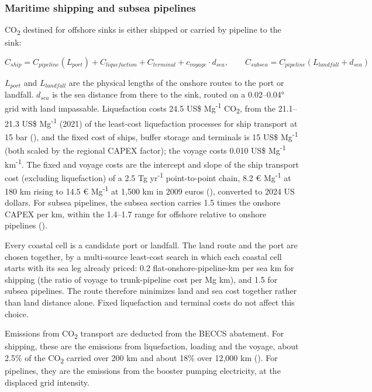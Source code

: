 \documentclass[
  letterpaper,
]{article}
\begin{document}
\subsubsection{Maritime shipping and subsea
pipelines}\label{maritime-shipping-and-subsea-pipelines}

CO\textsubscript{2} destined for offshore sinks is either shipped or
carried by pipeline to the sink:

\[C_{ship} = C_{pipeline}(L_{port}) + C_{liquefaction} + C_{terminal} + c_{voyage} \cdot d_{sea}, \qquad C_{subsea} = C_{pipeline}(L_{landfall} + d_{sea})\]

\(L_{port}\) and \(L_{landfall}\) are the physical lengths of the
onshore routes to the port or landfall. \(d_{sea}\) is the sea distance
from there to the sink, routed on a 0.02--0.04° grid with land
impassable. Liquefaction costs 24.5 US\$ Mg\textsuperscript{-1}
CO\textsubscript{2}, from the 21.1--21.3 US\$ Mg\textsuperscript{-1}
(2021) of the least-cost liquefaction processes for ship transport at 15
bar (), and the fixed cost
of ships, buffer storage and terminals is 15 US\$ Mg\textsuperscript{-1}
(both scaled by the regional CAPEX factor); the voyage costs 0.010 US\$
Mg\textsuperscript{-1} km\textsuperscript{-1}. The fixed and voyage
costs are the intercept and slope of the ship transport cost (excluding
liquefaction) of a 2.5 Tg yr\textsuperscript{-1} point-to-point chain,
8.2 € Mg\textsuperscript{-1} at 180 km rising to 14.5 €
Mg\textsuperscript{-1} at 1,500 km in 2009 euros
(), converted to 2024 US
dollars. For subsea pipelines, the subsea section carries 1.5 times the
onshore CAPEX per km, within the 1.4--1.7 range for offshore relative to
onshore pipelines ().

Every coastal cell is a candidate port or landfall. The land route and
the port are chosen together, by a multi-source least-cost search in
which each coastal cell starts with its sea leg already priced: 0.2
flat-onshore-pipeline-km per sea km for shipping (the ratio of voyage to
trunk-pipeline cost per Mg km), and 1.5 for subsea pipelines. The route
therefore minimizes land and sea cost together rather than land distance
alone. Fixed liquefaction and terminal costs do not affect this choice.

Emissions from CO\textsubscript{2} transport are deducted from the BECCS
abatement. For shipping, these are the emissions from liquefaction,
loading and the voyage, about 2.5\% of the CO\textsubscript{2} carried
over 200 km and about 18\% over 12,000 km
(). For pipelines, they are the
emissions from the booster pumping electricity, at the displaced grid
intensity.
\end{document}
